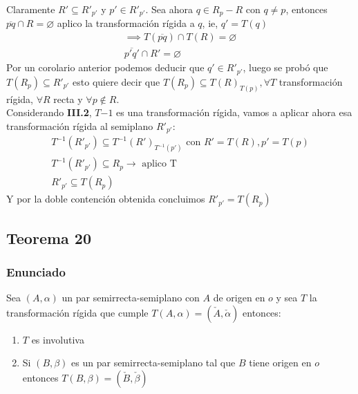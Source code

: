 \documentclass[a4paper]{article}
\begin{document}
Claramente $R' \subseteq R'_{p'}$ y $p' \in R'_{p'}$. Sea ahora $q \in R_p-R$ con $q\neq p$, entonces $\overline{pq} \cap R = \varnothing$ aplico la transformación rígida a $q$, ie, $q'=T(q)$
\begin{gather*}
    \implies T(\overline{pq})\cap T(R)=\varnothing\\
    \overline{p'q'} \cap R'=\varnothing
\end{gather*}
Por un corolario anterior podemos deducir que $q' \in R'_{p'}$, luego se probó que $T(R_p)\subseteq R'_{p'}$ esto quiere decir que $T(R_p) \subseteq T(R)_{T(p)}, \forall T$ transformación rígida, $\forall R$ recta y $\forall p \notin R$.\\
Considerando \textbf{III.2}, $T{-1}$ es una transformación rígida, vamos a aplicar ahora esa transformación rígida al semiplano $R'_{p'}$:\\
\begin{gather*}
    T^{-1}(R'_{p'}) \subseteq T^{-1}(R')_{T^{-1}(p')} \text{ con } R'=T(R), p'=T(p)\\
    T^{-1}(R'_{p'}) \subseteq R_p \rightarrow \text{ aplico T}\\
    R'_{p'} \subseteq T(R_p)
\end{gather*}
 Y por la doble contención obtenida concluimos $R'_{p'}=T(R_p)$
\subsection{Teorema 20}
\subsubsection{Enunciado}
Sea $(A,\alpha)$ un par semirrecta-semiplano con $A$ de origen en $o$ y sea $T$ la transformación rígida que cumple $T(A,\alpha)=(\check{A},\check{\alpha})$ entonces:
\begin{enumerate}
    \item $T$ es involutiva
    \item Si $(B, \beta)$ es un par semirrecta-semiplano tal que $B$ tiene origen en $o$ entonces $T(B,\beta)=(\check{B},\check{\beta})$
\end{enumerate}
\end{document}
